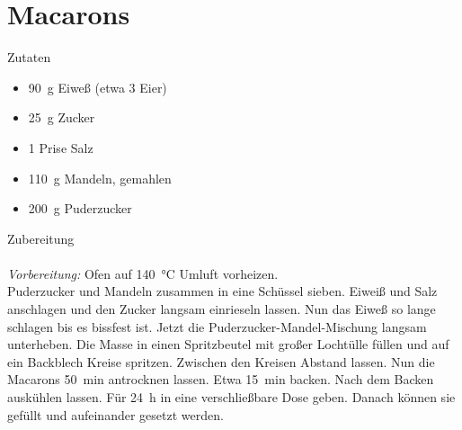 \section*{Macarons}
\ihead{}\ohead{}
\cfoot{}
{\Large Zutaten}
\begin{multicols}{2}
\begin{itemize}
    \item \SI{90}{g} Eiweß (etwa \num{3} Eier)
    \item \SI{25}{g} Zucker
    \item \num{1} Prise Salz
    \item \SI{110}{g} Mandeln, gemahlen
    \item \SI{200}{g} Puderzucker
\end{itemize}
\end{multicols}
\noindent
{\Large Zubereitung}\\
\\
\textit{Vorbereitung:} Ofen auf \SI{140}{\celsius} Umluft vorheizen.\\
Puderzucker und Mandeln zusammen in eine Schüssel sieben. 
Eiweiß und Salz anschlagen und den Zucker langsam einrieseln lassen. 
Nun das Eiweß so lange schlagen bis es bissfest ist. 
Jetzt die Puderzucker-Mandel-Mischung langsam unterheben. 
Die Masse in einen Spritzbeutel mit großer Lochtülle füllen und auf ein Backblech Kreise spritzen. 
Zwischen den Kreisen Abstand lassen.
Nun die Macarons \SI{50}{min} antrocknen lassen.
Etwa \SI{15}{min} backen. 
Nach dem Backen auskühlen lassen.
Für \SI{24}{h} in eine verschließbare Dose geben. 
Danach können sie gefüllt und aufeinander gesetzt werden. 
